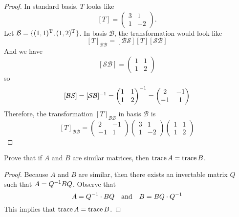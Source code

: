 \begin{proof}
  In standard basis, $T$ looks like
  \[ [T]= \begin{pmatrix} 3 &1\\ 1 &-2 \end{pmatrix}.\]
  Let $\mathcal{B}=\{(1,1)^\mathrm{T}, (1,2)^\mathrm{T}\}$. In basis $\mathcal{B}$,
  the transformation would look like
  \[
    [T]_{\mathcal{BB}}= [\mathcal{BS}] [T] [\mathcal{SB}]
  \]
  And we have
  \[ [\mathcal{SB}]= \begin{pmatrix} 1 &1\\ 1 &2 \end{pmatrix} \]
  so
  \[
    [\mathcal{BS}]= [\mathcal{SB}]^{-1}=
    \begin{pmatrix} 1 &1\\ 1 &2 \end{pmatrix}^{-1}=
    \begin{pmatrix} 2 &-1\\ -1&1 \end{pmatrix}
  \]
  Therefore, the transformation $[T]_{\mathcal{BB}}$ in basis
  $\mathcal{B}$ is
  \[
    [T]_{\mathcal{BB}}=
    \begin{pmatrix} 2 &-1\\ -1&1 \end{pmatrix}
    \begin{pmatrix} 3 &1\\ 1 &-2 \end{pmatrix}
    \begin{pmatrix} 1 &1\\ 1 &2 \end{pmatrix} 
  \]
\end{proof}
\begin{exercise}
  Prove that if $A$ and $B$ are similar matrices, then
  $\operatorname{trace} A=\operatorname{trace} B$.
\end{exercise}
\begin{proof}
  Because $A$ and $B$ are similar, then there exists 
  an invertable matrix $Q$ such that $A=Q^{-1} BQ$. Observe that
  \[
    A=Q^{-1}\cdot BQ
    \quad\text{and}\quad
    B=BQ\cdot Q^{-1}
  \]
  This implies that $\operatorname{trace} A=\operatorname{trace} B$.
\end{proof}








